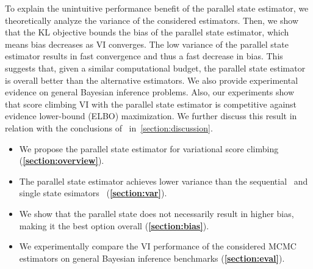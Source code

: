 To explain the unintuitive performance benefit of the parallel state estimator, we theoretically analyze the variance of the considered estimators.
Then, we show that the KL objective bounds the bias of the parallel state estimator, which means bias decreases as VI converges.
The low variance of the parallel state estimator results in fast convergence and thus a fast decrease in bias.
This suggests that, given a similar computational budget, the parallel state estimator is overall better than the alternative estimators.
We also provide experimental evidence on general Bayesian inference problems.
Also, our experiments show that score climbing VI with the parallel state estimator is competitive against evidence lower-bound (ELBO) maximization.
We further discuss this result in relation with the conclusions of~\citet{dhaka_challenges_2021} in~\cref{section:discussion}.



\begin{itemize}[noitemsep]
\item[\ding{228}] We propose the parallel state estimator for variational score climbing (\textbf{\cref{section:overview}}).
\item[\ding{228}] The parallel state estimator achieves lower variance than the sequential~\citep{pmlr-v124-ou20a} and single state esimators~\citep{NEURIPS2020_b2070693} (\textbf{\cref{section:var}}).
\item[\ding{228}] We show that the parallel state does not necessarily result in higher bias, making it the best option overall (\textbf{\cref{section:bias}}).
\item[\ding{228}] We experimentally compare the VI performance of the considered MCMC estimators on general Bayesian inference benchmarks (\textbf{\cref{section:eval}}).
\end{itemize}
\vspace{-0.05in}

